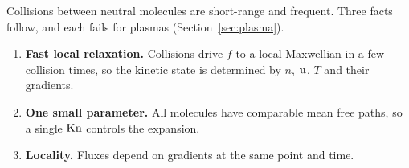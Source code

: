 Collisions between neutral molecules are short-range and frequent. Three
facts follow, and each fails for plasmas (Section~\ref{sec:plasma}).
\begin{enumerate}
  \item \textbf{Fast local relaxation.} Collisions drive $f$ to a local
    Maxwellian in a few collision times, so the kinetic state is determined
    by $n$, $\mathbf{u}$, $T$ and their gradients.
  \item \textbf{One small parameter.} All molecules have comparable mean
    free paths, so a single $\mathrm{Kn}$ controls the expansion.
  \item \textbf{Locality.} Fluxes depend on gradients at the same point and
    time.
\end{enumerate}
